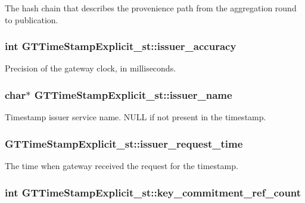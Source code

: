\label{struct_g_t_time_stamp_explicit__st_afe631a5415e03342c5381923f5772c7f}
The hash chain that describes the provenience path from the aggregation round to publication. \hypertarget{struct_g_t_time_stamp_explicit__st_a58fc0e0cf97e36dbbc57923840d115a1}{
\subsubsection[{issuer\_\-accuracy}]{\setlength{\rightskip}{0pt plus 5cm}int {\bf GTTimeStampExplicit\_\-st::issuer\_\-accuracy}}}
\label{struct_g_t_time_stamp_explicit__st_a58fc0e0cf97e36dbbc57923840d115a1}
Precision of the gateway clock, in milliseconds. \hypertarget{struct_g_t_time_stamp_explicit__st_a3db712f6cf2bc478b244de8214070fe0}{
\subsubsection[{issuer\_\-name}]{\setlength{\rightskip}{0pt plus 5cm}char$\ast$ {\bf GTTimeStampExplicit\_\-st::issuer\_\-name}}}
\label{struct_g_t_time_stamp_explicit__st_a3db712f6cf2bc478b244de8214070fe0}
Timestamp issuer service name. {\ttfamily NULL} if not present in the timestamp. \hypertarget{struct_g_t_time_stamp_explicit__st_a35aa6d365a997b7d027dbe573c1c62f8}{
\subsubsection[{issuer\_\-request\_\-time}]{ {\bf GTTimeStampExplicit\_\-st::issuer\_\-request\_\-time}}}
\label{struct_g_t_time_stamp_explicit__st_a35aa6d365a997b7d027dbe573c1c62f8}
The time when gateway received the request for the timestamp. \hypertarget{struct_g_t_time_stamp_explicit__st_a524b118c600484b08ab9cf92f0ea3130}{
\subsubsection[{key\_\-commitment\_\-ref\_\-count}]{\setlength{\rightskip}{0pt plus 5cm}int {\bf GTTimeStampExplicit\_\-st::key\_\-commitment\_\-ref\_\-count}}}
